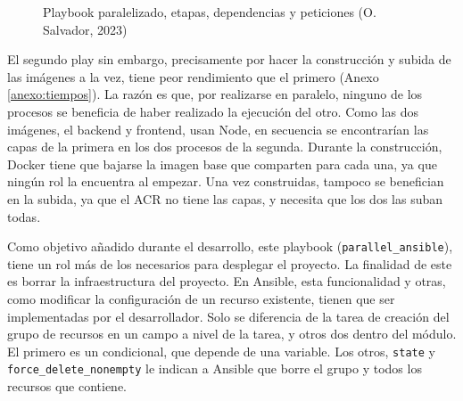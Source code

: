 \documentclass[11pt]{article}
\begin{document}
\begin{flushleft}
        \begin{figure}[htb]
			\centering
			\caption{Playbook paralelizado, etapas, dependencias y peticiones (O. Salvador, 2023)}
		\end{figure}
        
    El segundo play sin embargo, precisamente por hacer la construcción y subida de las imágenes a la vez, tiene peor rendimiento que el primero (Anexo \ref{anexo:tiempos}). La razón es que, por realizarse en paralelo, ninguno de los procesos se beneficia de haber realizado la ejecución del otro. Como las dos imágenes, el backend y frontend, usan Node, en secuencia se encontrarían las capas de la primera en los dos procesos de la segunda. Durante la construcción, Docker tiene que bajarse la imagen base que comparten para cada una, ya que ningún rol la encuentra al empezar. Una vez construidas, tampoco se benefician en la subida, ya que el ACR no tiene las capas, y necesita que los dos las suban todas.
    \linebreak
    
    Como objetivo añadido durante el desarrollo, este playbook (\texttt{parallel\_ansible}), tiene un rol más de los necesarios para desplegar el proyecto. La finalidad de este es borrar la infraestructura del proyecto. En Ansible, esta funcionalidad y otras, como modificar la configuración de un recurso existente, tienen que ser implementadas por el desarrollador. Solo se diferencia de la tarea de creación del grupo de recursos en un campo a nivel de la tarea, y otros dos dentro del módulo. El primero es un condicional, que depende de una variable. Los otros, \texttt{state} y \texttt{force\_delete\_nonempty} le indican a Ansible que borre el grupo y todos los recursos que contiene.
   \linebreak


\end{flushleft}
\end{document}
